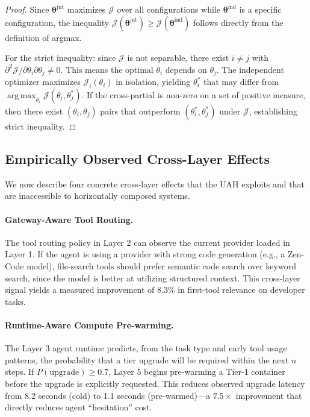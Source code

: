 \documentclass[11pt]{article}
\DeclareMathOperator*{\argmax}{arg\,max}
\begin{document}
\begin{proof}
Since $\bm{\theta}^{\text{jnt}}$ maximizes $\mathcal{J}$ over all
configurations while $\bm{\theta}^{\text{ind}}$ is a specific configuration,
the inequality $\mathcal{J}(\bm{\theta}^{\text{jnt}}) \geq
\mathcal{J}(\bm{\theta}^{\text{ind}})$ follows directly from the definition
of argmax.

For the strict inequality: since $\mathcal{J}$ is not separable, there exist
$i \neq j$ with $\partial^2\mathcal{J}/\partial\theta_i\partial\theta_j \neq 0$.
This means the optimal $\theta_i$ depends on $\theta_j$. The independent
optimizer maximizes $\mathcal{J}_i(\theta_i)$ in isolation, yielding
$\theta_i^*$ that may differ from $\argmax_{\theta_i} \mathcal{J}(\theta_i,
\theta_j^*)$. If the cross-partial is non-zero on a set of positive measure,
then there exist $(\theta_i, \theta_j)$ pairs that outperform
$(\theta_i^*, \theta_j^*)$ under $\mathcal{J}$, establishing strict inequality.
\end{proof}

\subsection{Empirically Observed Cross-Layer Effects}

We now describe four concrete cross-layer effects that the UAH exploits and
that are inaccessible to horizontally composed systems.

\paragraph{Gateway-Aware Tool Routing.}
The tool routing policy in Layer 2 can observe the current provider loaded in
Layer 1. If the agent is using a provider with strong code generation (e.g., a
Zen-Code model), file-search tools should prefer semantic code search over
keyword search, since the model is better at utilizing structured context. This
cross-layer signal yields a measured improvement of 8.3\% in first-tool
relevance on developer tasks.

\paragraph{Runtime-Aware Compute Pre-warming.}
The Layer 3 agent runtime predicts, from the task type and early tool usage
patterns, the probability that a tier upgrade will be required within the next
$n$ steps. If $P(\text{upgrade}) \geq 0.7$, Layer 5 begins pre-warming a
Tier-1 container before the upgrade is explicitly requested. This reduces
observed upgrade latency from 8.2 seconds (cold) to 1.1 seconds
(pre-warmed)---a $7.5\times$ improvement that directly reduces agent
``hesitation'' cost.
\end{document}
